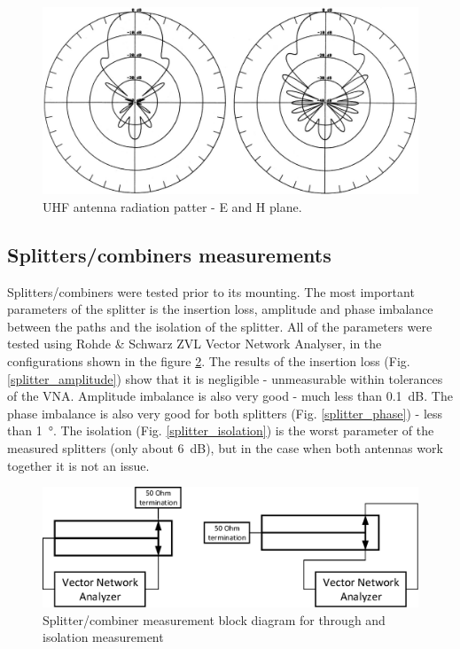 \begin{figure}
    \centering
    \includegraphics[width=0.75\paperwidth]{img/5/radiation_435.png}
    \caption{UHF antenna radiation patter - E and H plane.}
    \label{radiation_435}
\end{figure}



\subsection{Splitters/combiners measurements}
Splitters/combiners were tested prior to its mounting. The most important parameters of the splitter is the insertion loss, amplitude and phase imbalance between the paths and the isolation of the splitter. All of the parameters were tested using Rohde \& Schwarz ZVL Vector Network Analyser, in the configurations shown in the figure \ref{splitter_measurement_diagram}. The results of the insertion loss (Fig. \ref{splitter_amplitude}) show that it is negligible - unmeasurable within tolerances of the VNA. Amplitude imbalance is also very good - much less than \SI{0.1}{\dB}. The phase imbalance is also very good for both splitters (Fig. \ref{splitter_phase}) - less than \SI{1}{\degree}. The isolation (Fig. \ref{splitter_isolation}) is the worst parameter of the measured splitters (only about \SI{6}{\dB}), but in the case when both antennas work together it is not an issue.

\begin{figure}
    \centering
    \includegraphics[width=0.75\paperwidth]{img/5/splitter_measurement_diagram.eps}
    \caption{Splitter/combiner measurement block diagram for through and isolation measurement}
    \label{splitter_measurement_diagram}
\end{figure}

